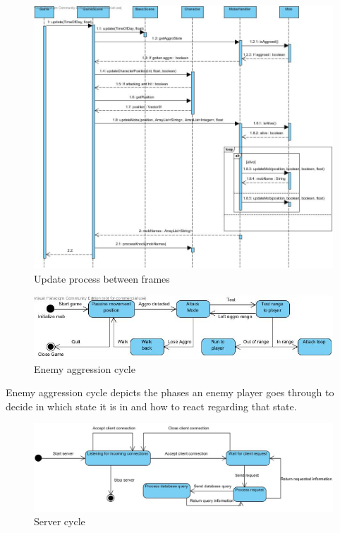 \documentclass[letterpaper]{article}
\begin{document}
			\begin{figure}[H]
			\centering
			\includegraphics[width=180mm]{UML_Diagram/Sequence/Update_Sequence.jpg}
			\caption{Update process between frames}
			\label{overflow}
			\end{figure}
			
			\begin{figure}[H]
			\centering
			\includegraphics[width=180mm]{UML_Diagram/State/Mob_Aggro.jpg}
			\caption{Enemy aggression cycle}
			\label{overflow}
			\end{figure}
			
			Enemy aggression cycle depicts the phases an enemy player goes through to decide in which state it is in and how to react regarding that state.
			
				\begin{figure}[H]
			\centering
			\includegraphics[width=180mm]{UML_Diagram/State/Server_State_Diagram.jpg}
			\caption{Server cycle}
			\label{overflow}
			\end{figure}
			
\end{document}
